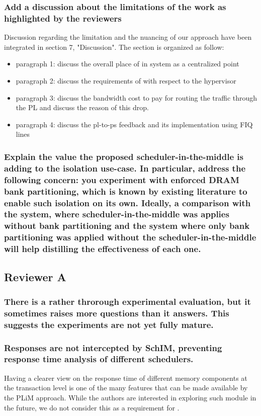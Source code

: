         \subsubsection{Add a discussion about the limitations of the work as highlighted by the reviewers}
            Discussion regarding the limitation and the nuancing of our approach have been integrated in section 7, "Discussion".
            The section is organized as follow:
            \begin{itemize}
                \item paragraph 1: discuss the overall place of \schim in system as a centralized point
                \item paragraph 2: discuss the requirements of \schim with respect to the hypervisor
                \item paragraph 3: discuss the bandwidth cost to pay for routing the traffic through the PL and discuss the reason of this drop.
                \item paragraph 4: discuss the pl-to-ps feedback and its implementation using FIQ lines
            \end{itemize}

        \subsubsection{Explain the value the proposed scheduler-in-the-middle is adding to the isolation use-case. In particular, address the following concern: you experiment with enforced DRAM bank partitioning, which is known by existing literature to enable such isolation on its own. Ideally, a comparison with the system, where scheduler-in-the-middle was applies without bank partitioning and the system where only bank partitioning was applied without the scheduler-in-the-middle will help distilling the effectiveness of each one.}


    \subsection{Reviewer A}
        \subsubsection{There is a rather throrough experimental evaluation, but it sometimes raises more questions than it answers. This suggests the experiments are not yet fully mature.}
            

        \subsubsection{Responses are not intercepted by SchIM, preventing response time analysis of different schedulers.}
            Having a clearer view on the response time of different memory components at the transaction level is one of the many features that can be made available by the PLiM approach. While the authors are interested in exploring such module in the future, we do not consider this as a requirement for \schim.

